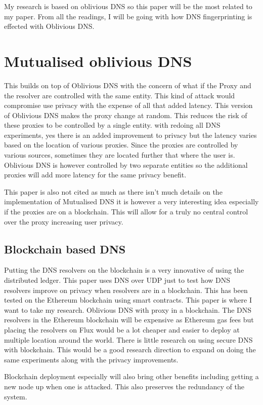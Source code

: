 \documentclass[10pt,conference]{IEEEtran}
\begin{document}
My research is based on oblivious DNS so this paper will be the most related to my paper. From all the readings, I will be going with how DNS fingerprinting is effected with Oblivious DNS.

\section{Mutualised oblivious DNS \cite{kurihara2021mutualized}}
This builds on top of Oblivious DNS with the concern of what if the Proxy and the resolver are controlled with the same entity. This kind of attack would compromise use privacy with the expense of all that added latency. This version of Oblivious DNS makes the proxy change at random. This reduces the risk of these proxies to be controlled by a single entity. with redoing all DNS experiments, yes there is an added improvement to privacy but the latency varies based on the location of various proxies. Since the proxies are controlled by various sources, sometimes they are located further that where the user is. Oblivious DNS is however controlled by two separate entities so the additional proxies will add more latency for the same privacy benefit.

This paper is also not cited as much as there isn't much details on the implementation of Mutualised DNS it is however a very interesting idea especially if the proxies are on a blockchain. This will allow for a truly no central control over the proxy increasing user privacy.

\subsection{Blockchain based DNS \cite{hsieh2022use}}
Putting the DNS resolvers on the blockchain is a very innovative of using the distributed ledger. This paper uses DNS over UDP just to test how DNS resolvers improve on privacy when resolvers are in a blockchain. This has been tested on the Ethereum blockchain using smart contracts. This paper is where I want to take my research. Oblivious DNS with proxy in a blockchain. The DNS resolvers in the Ethereum blockchain will be expensive as Ethereum gas fees but placing the resolvers on Flux would be a lot cheaper and easier to deploy at multiple location around the world. There is little research on using secure DNS with blockchain. This would be a good research direction to expand on doing the same experiments along with the privacy improvements. 

Blockchain deployment especially will also bring other benefits including getting a new node up when one is attacked. This also preserves the redundancy of the system.



\end{document}
